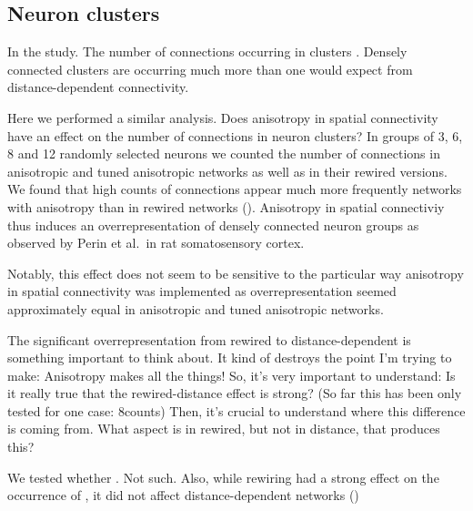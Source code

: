 \clearpage
\pagebreak
\newpage

\subsection*{Neuron clusters}

In the study. The number of connections occurring in clusters
. Densely connected clusters are occurring much more than one would
expect from distance-dependent connectivity.

Here we performed a similar analysis. Does anisotropy in spatial
connectivity have an effect on the number of connections in neuron
clusters? In groups of 3, 6, 8 and 12 randomly selected neurons we
counted the number of connections in anisotropic and tuned anisotropic
networks as well as in their rewired versions. We found that high
counts of connections appear much more frequently networks with
anisotropy than in rewired networks
(). Anisotropy in spatial connectiviy thus
induces an overrepresentation of densely connected neuron groups as
observed by Perin et al.~in rat somatosensory cortex.




Notably, this effect does not seem to be sensitive to the particular
way anisotropy in spatial connectivity was implemented as
overrepresentation seemed approximately equal in anisotropic and tuned
anisotropic networks. 



The significant overrepresentation from rewired to distance-dependent
is something important to think about. It kind of destroys the point
I'm trying to make: Anisotropy makes all the things! So, it's very
important to understand: Is it really true that the rewired-distance
effect is strong? (So far this has been only tested for one case:
8counts) Then, it's crucial to understand where this difference is
coming from. What aspect is in rewired, but not in distance, that
produces this?

We tested whether . Not such. Also, while rewiring had a strong effect
on the occurrence of , it did not affect distance-dependent networks
()
